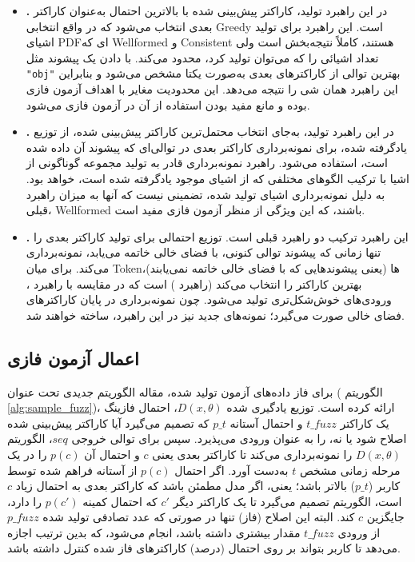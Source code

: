 \begin{itemize}
	\item{
		\textbf{.}
	 در این راهبرد تولید، کاراکتر پیش‌بینی شده با بالاترین احتمال به‌عنوان کاراکتر بعدی انتخاب می‌شود که در واقع انتخابی \gls{Greedy} است. این راهبرد برای تولید اشیای \gls{PDF}ای که \gls{Wellformed} و \gls{Consistent} هستند، کاملاً نتیجه‌بخش است ولی تعداد اشیائی را که می‌توان تولید کرد، محدود می‌کند. با دادن یک پیشوند مثل  \texttt{"obj"}  بهترین توالی از کاراکترهای بعدی به‌صورت یکتا مشخص می‌شود و بنابراین این راهبرد همان شی را نتیجه می‌دهد. این محدودیت مغایر با اهداف آزمون فازی بوده و مانع مفید بودن استفاده از آن در آزمون فازی می‌شود. 
}
\item{
	\textbf{.}
در این راهبرد تولید، به‌جای انتخاب محتمل‌ترین کاراکتر پیش‌بینی شده، از توزیع یادگرفته شده، برای نمونه‌برداری کاراکتر بعدی در توالی‌ای که پیشوند آن داده شده است، استفاده می‌شود. راهبرد نمونه‌برداری قادر به تولید مجموعه گوناگونی از اشیا با ترکیب الگوهای مختلفی که از اشیای موجود یادگرفته شده است، خواهد بود. به دلیل نمونه‌برداری اشیای تولید شده، تضمینی نیست که آنها به میزان راهبرد قبلی،  \gls{Wellformed} باشند، که این ویژگی از منظر آزمون فازی مفید است.
}

\item{
	\textbf{.}
این راهبرد ترکیب دو راهبرد قبلی است.  توزیع احتمالی برای تولید کاراکتر بعدی را تنها زمانی که پیشوند توالی کنونی، با فضای خالی خاتمه می‌یابد، نمونه‌برداری می‌کند. برای میان \gls{Token}‌ها (یعنی پیشوندهایی که با فضای خالی خاتمه نمی‌یابند)، بهترین کاراکتر را انتخاب می‌کند (راهبرد ) است که در مقایسه با راهبرد ،  ورودی‌های خوش‌شکل‌تری تولید می‌شود. چون نمونه‌برداری در پایان کاراکترهای فضای خالی صورت می‌گیرد؛ نمونه‌های جدید نیز در این راهبرد، ساخته خواهند شد.
}
\end{itemize}

\subsection{اعمال آزمون فازی}

برای فاز داده‌های آزمون تولید شده، مقاله الگوریتم جدیدی تحت عنوان  ( الگوریتم \ref{alg:sample_fuzz})، ارائه کرده است.  توزیع یادگیری شده
 $ D(x,\theta) $،
احتمال فازینگ یک کاراکتر $ t\_fuzz $ و احتمال آستانه‌ $ p\_t $ که تصمیم می‌گیرد آیا کاراکتر پیش‌بینی شده اصلاح شود یا نه، را به عنوان ورودی می‌پذیرد. سپس برای توالی خروجی $  seq $، الگوریتم $ D(x,\theta) $ را نمونه‌برداری می‌کند تا کاراکتر بعدی یعنی $ c $ و احتمال آن $ p(c)$ را در یک مرحله زمانی مشخص $ t $ به‌دست آورد. اگر احتمال $ p(c)$ از آستانه فراهم شده توسط کاربر ($ p\_t $) بالاتر باشد؛ یعنی، اگر مدل مطمئن باشد که کاراکتر بعدی به احتمال زیاد  $ c $ است، الگوریتم تصمیم می‌گیرد تا یک کاراکتر دیگر $ c' $ که احتمال کمینه $ p(c') $ را دارد، جایگزین $ c $ کند. البته این اصلاح (فاز) تنها در صورتی که عدد تصادفی تولید شده $ p\_fuzz $ از ورودی $ t\_fuzz $  مقدار بیشتری داشته باشد، انجام می‌شود، که بدین ترتیب اجازه می‌دهد تا کاربر بتواند بر روی احتمال (درصد) کاراکترهای فاز شده کنترل داشته ‌باشد.

